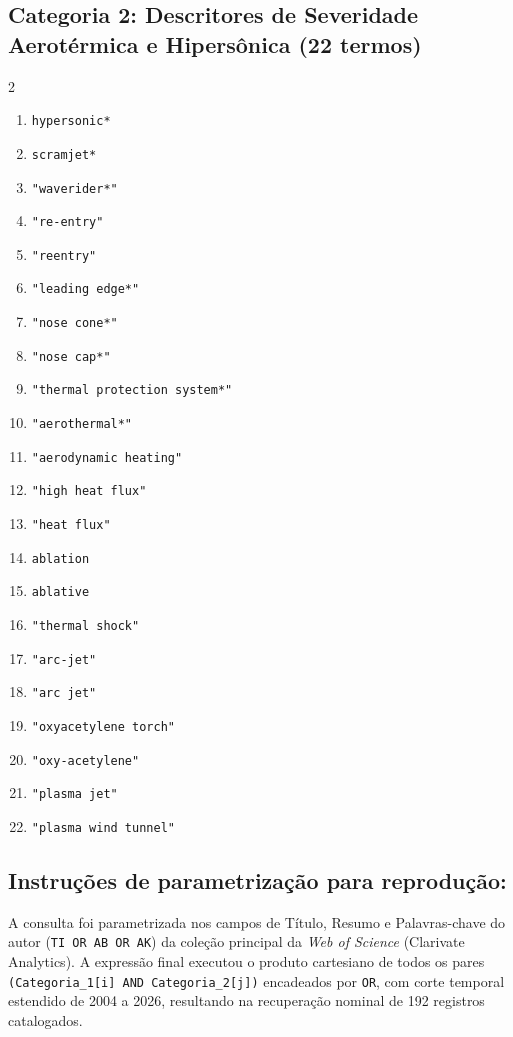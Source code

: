 \subsection*{Categoria 2: Descritores de Severidade Aerotérmica e Hipersônica (22 termos)}
\begin{multicols}{2}
\begin{enumerate}\footnotesize\itemsep=1pt\parsep=0pt
  \item \texttt{hypersonic*}
  \item \texttt{scramjet*}
  \item \texttt{"waverider*"}
  \item \texttt{"re-entry"}
  \item \texttt{"reentry"}
  \item \texttt{"leading edge*"}
  \item \texttt{"nose cone*"}
  \item \texttt{"nose cap*"}
  \item \texttt{"thermal protection system*"}
  \item \texttt{"aerothermal*"}
  \item \texttt{"aerodynamic heating"}
  \item \texttt{"high heat flux"}
  \item \texttt{"heat flux"}
  \item \texttt{ablation}
  \item \texttt{ablative}
  \item \texttt{"thermal shock"}
  \item \texttt{"arc-jet"}
  \item \texttt{"arc jet"}
  \item \texttt{"oxyacetylene torch"}
  \item \texttt{"oxy-acetylene"}
  \item \texttt{"plasma jet"}
  \item \texttt{"plasma wind tunnel"}
\end{enumerate}
\end{multicols}

\subsection*{Instruções de parametrização para reprodução:}
A consulta foi parametrizada nos campos de Título, Resumo e Palavras-chave do autor (\texttt{TI OR AB OR AK}) da coleção principal da \emph{Web of Science} (Clarivate Analytics). A expressão final executou o produto cartesiano de todos os pares \texttt{(Categoria\_1[i] AND Categoria\_2[j])} encadeados por \texttt{OR}, com corte temporal estendido de 2004 a 2026, resultando na recuperação nominal de 192 registros catalogados.

